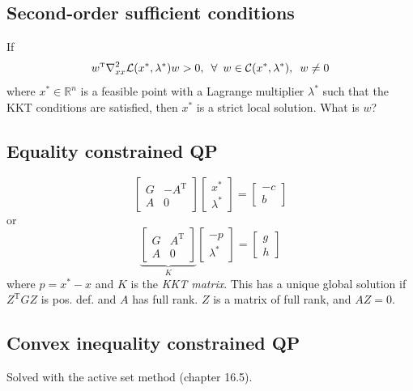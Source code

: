 \documentclass[a4paper, 12pt]{article}
\newcommand{\comment}[1]{\textcolor{RedOrange}{#1}}
\theoremstyle{definition}
\newcommand{\T}{^{\scriptscriptstyle \text{T}}}
\newcommand{\lagrange}{\mathcal{L}}
\newcommand{\hess}{\nabla_{xx}^2}
\newcommand{\enforall}{\enspace \forall \enspace}
\begin{document}
\subsection{Second-order sufficient conditions}
If
\begin{equation}
	w\T \hess \lagrange(x^*, \lambda^*) w > 0, \enforall w \in \mathcal{C}(x^*, \lambda^*), \enskip w \neq 0
\end{equation}
where \(x^* \in \mathbb{R}^n\) is a feasible point with a Lagrange multiplier \(\lambda^*\) such that the KKT conditions are satisfied, then \(x^*\) is a strict local solution. \comment{What is \(w\)?}

\subsection{Equality constrained QP}
\begin{equation}
	\begin{bmatrix} G & -A\T \\ A &  0 \end{bmatrix}
	\begin{bmatrix} x^* \\ \lambda^* \end{bmatrix}
	=
	\begin{bmatrix} -c \\ b \end{bmatrix}
\end{equation}
or
\begin{equation}
	\underbrace{\begin{bmatrix} G & A\T \\ A &  0 \end{bmatrix}}_K
	\begin{bmatrix} -p \\ \lambda^* \end{bmatrix}
	=
	\begin{bmatrix} g \\ h \end{bmatrix}
\end{equation}
where \(p = x^* - x\) and \(K\) is the \emph{KKT matrix}. This has a unique global solution if \(Z\T G Z\) is pos. def. and \(A\) has full rank. \(Z\) is a matrix of full rank, and \(AZ = 0\).

\subsection{Convex inequality constrained QP}
Solved with the active set method (chapter 16.5).
\end{document}
